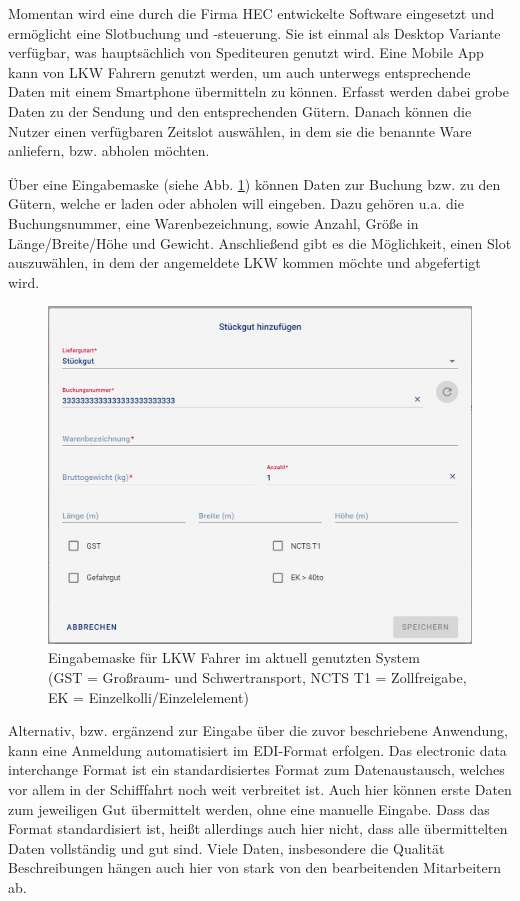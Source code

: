 Momentan wird eine durch die Firma HEC entwickelte Software eingesetzt und ermöglicht eine Slotbuchung und -steuerung. Sie ist einmal als Desktop Variante verfügbar, was hauptsächlich von Spediteuren genutzt wird. Eine Mobile App kann von LKW Fahrern genutzt werden, um auch unterwegs entsprechende Daten mit einem Smartphone übermitteln zu können. Erfasst werden dabei grobe Daten zu der Sendung und den entsprechenden Gütern. Danach können die Nutzer einen verfügbaren Zeitslot auswählen, in dem sie die benannte Ware anliefern, bzw. abholen möchten. 

Über eine Eingabemaske (siehe Abb. \ref{fig:eingabemaske_aktuelles_system}) können Daten zur Buchung bzw. zu den Gütern, welche er laden oder abholen will eingeben. Dazu gehören u.a. die Buchungsnummer, eine Warenbezeichnung, sowie Anzahl, Größe in Länge/Breite/Höhe und Gewicht. Anschließend gibt es die Möglichkeit, einen Slot auszuwählen, in dem der angemeldete LKW kommen möchte und abgefertigt wird.

\begin{figure}[H]
    \centering
    \includegraphics[width=\textwidth]{images/Eingabemaske_aktuelles_System.png}
    \caption[Eingabemaske für LKW Fahrer im aktuell genutzten System]{Eingabemaske für LKW Fahrer im aktuell genutzten System \\ (GST = Großraum- und Schwertransport, NCTS T1 = Zollfreigabe, EK = Einzelkolli/Einzelelement)}
    \label{fig:eingabemaske_aktuelles_system}
\end{figure} 

Alternativ, bzw. ergänzend zur Eingabe über die zuvor beschriebene Anwendung, kann eine Anmeldung automatisiert im EDI-Format erfolgen. Das \glqq{}electronic data interchange\grqq{} Format ist ein standardisiertes Format zum Datenaustausch, welches vor allem in der Schifffahrt noch weit verbreitet ist. Auch hier können erste Daten zum jeweiligen Gut übermittelt werden, ohne eine manuelle Eingabe. Dass das Format standardisiert ist, heißt allerdings auch hier nicht, dass alle übermittelten Daten vollständig und gut sind. Viele Daten, insbesondere die Qualität Beschreibungen hängen auch hier von stark von den bearbeitenden Mitarbeitern ab. 

